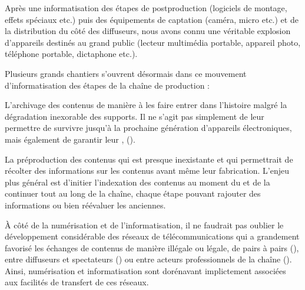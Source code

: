 Après une informatisation des étapes de postproduction (logiciels de montage, effets spéciaux etc.) puis des équipements de captation (caméra, micro etc.) et de la distribution du côté des diffuseurs, nous avons connu une véritable explosion d'appareils destinés au grand public (lecteur multimédia portable, appareil photo, téléphone portable, dictaphone etc.).


Plusieurs grands chantiers s'ouvrent désormais dans ce mouvement d'informatisation des étapes de la chaîne de production :
\begin{liste}
	\item L'archivage des contenus de manière à les faire entrer dans l'histoire malgré la dégradation inexorable des supports. 
	Il ne s'agit pas simplement de leur permettre de survivre jusqu'à la prochaine génération d'appareils électroniques, mais également de garantir leur , (\cite[p.~12]{Bachimont2000}).

	\item La préproduction des contenus qui est presque inexistante et qui permettrait de récolter des informations sur les contenus avant même leur fabrication. 
	L'enjeu plus général est d'initier l'indexation des contenus au moment du  et de la continuer tout au long de la chaîne, chaque étape pouvant rajouter des informations ou bien réévaluer les anciennes.
\end{liste}

À côté de la numérisation et de l'informatisation, il ne faudrait pas oublier le développement considérable des réseaux de télécommunications qui a grandement favorisé les échanges de contenus de manière illégale ou légale, de pairs à pairs (), entre diffuseurs et spectateurs () ou entre acteurs professionnels de la chaîne (). 
Ainsi, numérisation et informatisation sont dorénavant implictement associées aux facilités de transfert de ces réseaux. 

